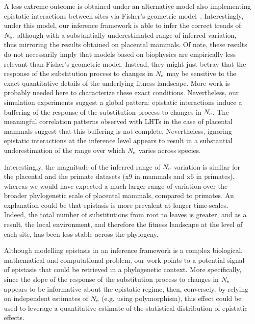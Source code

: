\documentclass{MBE}
\begin{document}
	A less extreme outcome is obtained under an alternative model also implementing epistatic interactions between sites via Fisher’s geometric model~\citep{Tenaillon2014,Blanquart2016}.
	Interestingly, under this model, our inference framework is able to infer the correct trends of $N_{\text{e}}$, although with a substantially underestimated range of inferred variation, thus mirroring the results obtained on placental mammals.
	Of note, these results do not necessarily imply that models based on biophysics are empirically less relevant than Fisher’s geometric model.
	Instead, they might just betray that the response of the {substitution} process to changes in $N_{\text{e}}$ may be sensitive to the exact quantitative details of the underlying fitness landscape.
	More work is probably needed here to characterize these exact conditions.
	Nevertheless, our simulation experiments suggest a global pattern: epistatic interactions induce a buffering of the response of the {substitution} process to changes in $N_{\text{e}}$.
	The meaningful correlation patterns observed with {LHT}s in the case of placental mammals suggest that this buffering is not complete.
	Nevertheless, ignoring epistatic interactions at the inference level appears to result in a substantial underestimation of the range over which $N_{\text{e}}$ varies across species.

	Interestingly, the magnitude of the inferred range of $N_{\text{e}}$ variation is similar for the placental and the primate datasets (x$9$ in mammals and x$6$ in primates), whereas we would have expected a much larger range of variation over the broader phylogenetic scale of placental mammals, compared to primates.
	An explanation could be that epistasis is more prevalent at longer time-scales.
	Indeed, the total number of substitutions from root to leaves is greater, and as a result, the local environment, and therefore the fitness landscape at the level of each site, has been less stable across the phylogeny.

	Although modelling epistasis in an inference framework is a complex biological, mathematical and computational problem, our work points to a potential signal of epistasis that could be retrieved in a phylogenetic context.
	More specifically, since the slope of the response of the {substitution} process to changes in $N_{\text{e}}$ appears to be informative about the epistatic regime, then, conversely, by relying on independent estimates of $N_{\text{e}}$ (e.g. using polymorphism), this effect could be used to leverage a quantitative estimate of the statistical distribution of epistatic effects.
\end{document}
